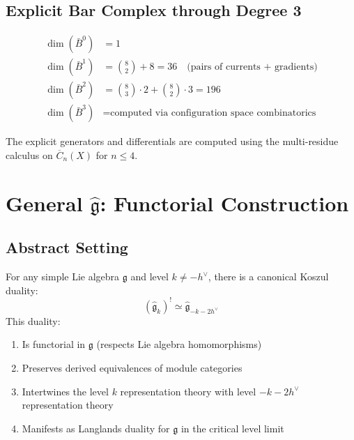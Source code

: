 \subsection{Explicit Bar Complex through Degree 3}

\begin{computation}\label{comp:sl3-bar-dimensions}
\begin{align}
\dim(\bar{B}^0) &= 1 \\
\dim(\bar{B}^1) &= \binom{8}{2} + 8 = 36 \quad \text{(pairs of currents + gradients)} \\
\dim(\bar{B}^2) &= \binom{8}{3} \cdot 2 + \binom{8}{2} \cdot 3 = 196 \\
\dim(\bar{B}^3) &= \text{computed via configuration space combinatorics}
\end{align}
\end{computation}

The explicit generators and differentials are computed using the multi-residue calculus on $\overline{C}_n(X)$ for $n \leq 4$.

\section{General $\widehat{\mathfrak{g}}$: Functorial Construction}

\subsection{Abstract Setting}

\begin{theorem}\label{thm:universal-kac-moody-koszul}
For any simple Lie algebra $\mathfrak{g}$ and level $k \neq -h^\vee$, there is a canonical Koszul duality:
\begin{equation}
\boxed{(\widehat{\mathfrak{g}}_k)^! \simeq \widehat{\mathfrak{g}}_{-k-2h^\vee}}
\end{equation}
This duality:
\begin{enumerate}
\item Is functorial in $\mathfrak{g}$ (respects Lie algebra homomorphisms)
\item Preserves derived equivalences of module categories
\item Intertwines the level $k$ representation theory with level $-k-2h^\vee$ representation theory
\item Manifests as Langlands duality for $\mathfrak{g}$ in the critical level limit
\end{enumerate}
\end{theorem}

